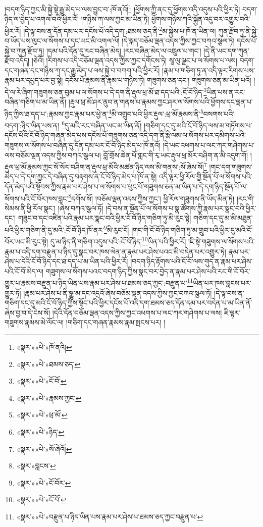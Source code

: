 །བདག་ཉིད་ཀྱང་མི་སྐྱེ་སྟེ་རྒྱུ་མེད་པ་ལས་བྱུང་བ་:ཁོ་ནའོ།\footnote{«སྣར་»«པེ་»ཁོ་ནའི།} །ཕྱོགས་ཀྱི་ནང་དུ་ཕྱོགས་འདི་འདུས་པའི་ཕྱིར་ཏེ། བདག་ཉིད་ལ་བྱེད་པ་འགལ་བའི་ཕྱིར་རོ། །གཉིས་ཀ་ལས་ཀྱང་མ་ཡིན་ཏེ། ཕྱོགས་གཉིས་ཀའི་སྐྱོན་འདུ་བར་འགྱུར་བའི་ཕྱིར་རོ། །དེ་ལྟ་བས་ན་དོན་དམ་པར་དངོས་པོ་འདི་དག་:ཐམས་ཅད་ནི་\footnote{«སྣར་»«པེ་»ཐམས་ཅད་}མ་སྐྱེས་པ་ཁོ་ན་ཡིན་ལ། ཀུན་རྫོབ་ཏུ་ནི་སྐྱེ་བ་ཡོད་པས་ལུང་ལ་སོགས་པ་དང་ཡང་མི་འགལ་ལོ། །དེ་སྐད་བཅོམ་ལྡན་འདས་ཀྱིས་ཀྱང་བཀའ་སྩལ་ཏེ། དངོས་པོ་སྐྱེ་བ་ཀུན་རྫོབ་ཏུ། །དམ་པའི་དོན་དུ་རང་བཞིན་མེད། །རང་བཞིན་མེད་ལ་འཁྲུལ་པ་གང་། །དེ་ནི་ཡང་དག་ཀུན་རྫོབ་འདོད། །ཅེའོ། །རིགས་པ་འདི་བཅོམ་ལྡན་འདས་ཀྱིས་ཀྱང་དགོངས་ཏེ། སཱ་ལུ་ལྗང་པ་ལ་སོགས་པ་ལས། བདག་དང་གཞན་དང་གཉིས་ཀ་དང་རྒྱུ་མེད་པ་ལས་སྐྱེ་བ་བཀག་པའི་ཕྱིར་རོ། །རྣམ་པ་གཅིག་ཏུ་ན་འདི་ལྟར་རིགས་པས་རྣམ་པར་དཔྱད་པར་བྱ་སྟེ། དངོས་པོ་རྣམས་ནི་རྣམ་པ་གཉིས་ཏེ། གཟུགས་ཅན་དང་། གཟུགས་ཅན་མ་ཡིན་པའོ། །དེ་ལ་རེ་ཞིག་གཟུགས་ཅན་བུམ་པ་ལ་སོགས་པ་དེ་དག་ནི་རྡུལ་ཕྲ་མོ་ཐ་དད་པའི་:ངོ་བོ་ཉིད་\footnote{«སྣར་»«པེ་»ངོ་བོ་}ཡིན་པས་ན་རང་བཞིན་གཅིག་པ་མ་ཡིན་ནོ། །རྡུལ་ཕྲ་མོ་ཤར་ནུབ་ན་གནས་པ་རྣམས་ཀྱང་ཤར་ལ་སོགས་པའི་ཕྱོགས་དང་ལྡན་པ་ཉིད་ཀྱིས་ཐ་དད་པ་:རྣམས་ཀྱང་རྣམ་པར་ཕྱེ་ན་\footnote{«སྣར་»«པེ་»རྣམས་ཀྱང་}མི་འགྲུབ་པའི་ཕྱིར་རྡུལ་:ཕྲ་མོ་རྣམས་ནི་\footnote{«སྣར་»«པེ་»ཕྲ་མོ་}བསགས་པའི་བདག་:ཉིད་ཡིན་པས་ན། \footnote{«སྣར་»«པེ་»ཉིད་}དུ་མའི་རང་བཞིན་ཡང་མ་ཡིན་ནོ། །གཅིག་དང་དུ་མའི་ངོ་བོ་ཉིད་ལས་མ་གཏོགས་པ་དངོས་པོའི་ངོ་བོ་ཉིད་གཞན་མེད་པས་དངོས་པོ་གཟུགས་ཅན་འདི་དག་ནི་རྨི་ལམ་ལ་སོགས་པར་དམིགས་པའི་གཟུགས་ལ་སོགས་པ་བཞིན་དུ་དོན་དམ་པར་ངོ་བོ་ཉིད་མེད་པ་ཁོ་ནའོ། །དེ་ཡང་འཕགས་པ་ལང་ཀར་གཤེགས་པ་ལས་བཅོམ་ལྡན་འདས་ཀྱིས་བཀའ་སྩལ་པ། བློ་གྲོས་ཆེན་པོ་གླང་གི་རྭ་ཡང་རྡུལ་ཕྲ་མོར་བཤིག་ན་མི་འདུག་གོ། །རྡུལ་ཕྲ་མོ་རྣམས་ཀྱང་སོ་སོར་བཤིག་ན་རྡུལ་ཕྲ་མོའི་མཚན་ཉིད་ལས་མི་གནས་:སོ་ཞེས་སོ།\footnote{«སྣར་»«པེ་»སོ་ཞེའོ།} །གང་དག་གཟུགས་མེད་པ་དེ་དག་ཀྱང་དེ་བཞིན་དུ་བརྟགས་ན་ངོ་བོ་ཉིད་མེད་པ་ཁོ་ན་སྟེ། འདི་ལྟར་ཕྱི་རོལ་གྱི་སྔོན་པོ་ལ་སོགས་པའི་དོན་མེད་པའི་སྟོབས་ཀྱིས་རྣམ་པར་ཤེས་པ་ལ་སོགས་པ་ཕུང་པོ་གཟུགས་ཅན་མ་ཡིན་པ་དེ་དག་ཉིད་སྔོན་པོ་ལ་སོགས་པའི་ངོ་བོར་ཁས་བླང་\footnote{«སྣར་»བླངས་}དགོས་སོ། །བཅོམ་ལྡན་འདས་ཀྱིས་ཀྱང་། ཕྱི་རོལ་གཟུགས་ནི་ཡོད་མིན་ཏེ། །རང་གི་སེམས་ནི་ཕྱི་རོལ་སྣང་། །ཞེས་བཀའ་སྩལ་ཏོ། །དེ་བས་ན་སྔོན་པོ་ལ་སོགས་པ་སྣ་ཚོགས་ཀྱི་རྣམ་པར་སྣང་བའི་ཕྱིར་དང་། གཟུང་བ་དང་འཛིན་པའི་རྣམ་པར་སྣང་བའི་ཕྱིར་ངོ་བོ་ཉིད་གཅིག་ཏུ་མི་རུང་སྟེ། གཅིག་དང་དུ་མ་མི་མཐུན་པའི་ཕྱིར་གཅིག་ནི་དུ་མའི་:ངོ་བོ་ཉིད་ཁོ་ནར་\footnote{«སྣར་»«པེ་»ངོ་བོར་}མི་རུང་ངོ། །གང་གི་ངོ་བོ་ཉིད་གཅིག་ཏུ་མ་གྲུབ་པའི་ཕྱིར་དུ་མའི་ངོ་བོར་ཡང་མི་རུང་སྟེ། དུ་མ་ཉིད་ནི་གཅིག་འདུས་པའི་:ངོ་བོ་ཉིད་\footnote{«སྣར་»«པེ་»ངོ་བོ་}ཡིན་པའི་ཕྱིར་རོ། །ཇི་སྟེ་གཟུགས་ལ་སོགས་པའི་རྣམ་པ་འདི་དག་བརྫུན་པ་ཉིད་དུ་སྣང་བར་ཁས་ལེན་ན་རྣམ་པར་ཤེས་པའང་མི་བདེན་པར་འགྱུར་ཏེ། རྣམ་པར་ཤེས་པ་དེའི་ངོ་བོ་ཉིད་དང་ཐ་དད་པ་མ་ཡིན་པའི་ཕྱིར་རོ། །བདག་ཉིད་རྟོགས་པའི་ངོ་བོ་ལས་གུད་ན་རྣམ་པར་ཤེས་པའི་ངོ་བོ་མེད་ལ། གཟུགས་ལ་སོགས་པའང་བདག་ཉིད་ཀྱིས་སྣང་བར་བྱེད་ན་རྣམ་པར་ཤེས་པའི་རང་གི་ངོ་བོར་གྱུར་པ་རྣམས་བརྫུན་པ་ཉིད་ཡིན་པས་རྣམ་པར་ཤེས་པ་ཐམས་ཅད་ཀྱང་:བརྫུན་པ་\footnote{«སྣར་»«པེ་»བརྫུན་པ་ཉིད་ཡིན་པས་རྣམ་པར་ཤེས་པ་ཐམས་ཅད་ཀྱང་བརྫུན་པ་}ཡིན་པར་ཁས་བླངས་པར་གྱུར་ཏོ། །རྣམ་པར་ཤེས་པ་ནི་སྒྱུ་མ་དང་འདྲའོ་ཞེས་བཅོམ་ལྡན་འདས་ཀྱིས་ཀྱང་བཀའ་སྩལ་ཏོ། །དེ་ལྟ་བས་ན་གཅིག་དང་དུ་མའི་ངོ་བོ་ཉིད་ཀྱིས་སྟོང་པའི་ཕྱིར་དངོས་པོ་འདི་དག་ཐམས་ཅད་དོན་དམ་པར་བདེན་པ་མ་ཡིན་ནོ་ཞེས་བྱ་བ་དེ་ངེས་སོ། །དེའི་དོན་བཅོམ་ལྡན་འདས་ཀྱིས་ཀྱང་འཕགས་པ་ལང་ཀར་གཤེགས་པ་ལས། ཇི་ལྟར་གཟུགས་རྣམས་མེ་ལོང་ལ། །གཅིག་དང་གཞན་རྣམས་རྣམ་སྤངས་པར། །
